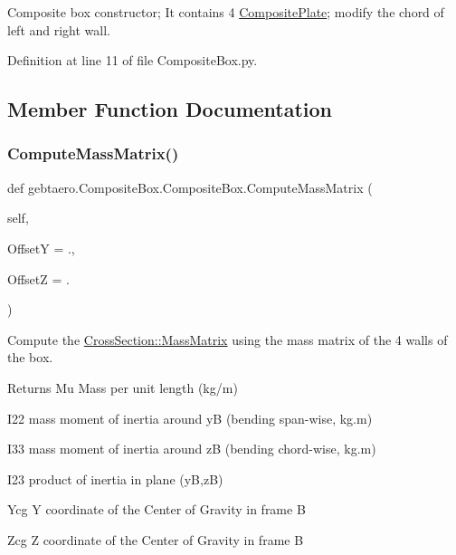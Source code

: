 Composite box constructor; It contains 4 \hyperlink{namespacegebtaero_1_1_composite_plate}{Composite\+Plate}; modify the chord of left and right wall. 



Definition at line 11 of file Composite\+Box.\+py.



\subsection{Member Function Documentation}
\mbox{\label{classgebtaero_1_1_composite_box_1_1_composite_box_a6b944eeef7002377d7b83c5dd6ae6550}} 
\subsubsection{\texorpdfstring{Compute\+Mass\+Matrix()}{ComputeMassMatrix()}}
{\footnotesize\ttfamily def gebtaero.\+Composite\+Box.\+Composite\+Box.\+Compute\+Mass\+Matrix (\begin{DoxyParamCaption}\item[{}]{self,  }\item[{}]{OffsetY = {.},  }\item[{}]{OffsetZ = {.} }\end{DoxyParamCaption})}



Compute the \hyperlink{classgebtaero_1_1_cross_section_1_1_cross_section_ae9be8649853163b2b4dfdaa3584d9f78}{Cross\+Section\+::\+Mass\+Matrix} using the mass matrix of the 4 walls of the box. 

\begin{DoxyReturn}{Returns}
Mu Mass per unit length (kg/m) 

I22 mass moment of inertia around yB (bending span-\/wise, kg.\+m) 

I33 mass moment of inertia around zB (bending chord-\/wise, kg.\+m) 

I23 product of inertia in plane (yB,zB) 

Ycg Y coordinate of the Center of Gravity in frame B 

Zcg Z coordinate of the Center of Gravity in frame B 
\end{DoxyReturn}


